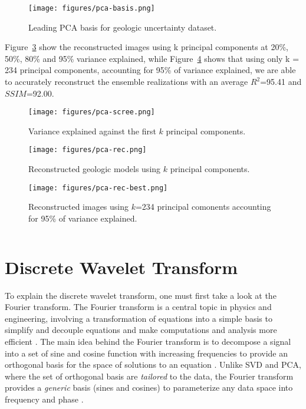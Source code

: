 \documentclass[a4paper,fleqn,12pt]{article}
\begin{document}
\begin{figure}[H]
    \centering
    \texttt{[image: figures/pca-basis.png]}
    \caption{Leading PCA basis for geologic uncertainty dataset.}
    \label{fig:pca-basis}
\end{figure}

Figure~\ref{fig:pca-rec} show the reconstructed images using k principal components at 20\%, 50\%, 80\% and 95\% variance explained, while Figure~\ref{fig:pca-rec-best} shows that using only k = 234 principal components, accounting for 95\% of
variance explained, we are able to accurately reconstruct the ensemble realizations with an average $R^2$=95.41 and $SSIM$=92.00.

\begin{figure}[H]
    \centering
    \texttt{[image: figures/pca-scree.png]}
    \caption{Variance explained against the first $k$ principal components.}
    \label{fig:pca-scree}
\end{figure}

\begin{figure}[H]
    \centering
    \texttt{[image: figures/pca-rec.png]}
    \caption{Reconstructed geologic models using $k$ principal components.}
    \label{fig:pca-rec}
\end{figure}

\begin{figure}[H]
    \centering
    \texttt{[image: figures/pca-rec-best.png]}
    \caption{Reconstructed images using $k$=234 principal comonents accounting for 95\% of variance explained.}
    \label{fig:pca-rec-best}
\end{figure}

\inputminted[frame=lines, framesep=2mm, baselinestretch=1.2, 
             bgcolor=LightGray, fontsize=\footnotesize, linenos]
{python}{codes/pca.py}


\pagebreak
\section*{Discrete Wavelet Transform}

To explain the discrete wavelet transform, one must first take a look at the Fourier transform. The Fourier transform is a central topic in physics and engineering, involving a transformation of equations into a simple basis to simplify and decouple equations and make computations and analysis more efficient \cite{duhamel1990fast, li2020fourier}. The main idea behind the Fourier transform is to decompose a signal into a set of sine and cosine function with increasing frequencies to provide an orthogonal basis for the space of solutions to an equation \cite{iorio2001fourier}. Unlike SVD and PCA, where the set of orthogonal basis are \emph{tailored} to the data, the Fourier transform provides a \emph{generic} basis (sines and cosines) to parameterize any data space into frequency and phase \cite{brunton2022data}.
\end{document}
